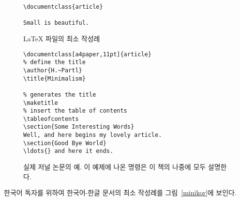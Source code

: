 
\begin{figure}[!p]
\begin{lined}{6cm}
\begin{verbatim}
\documentclass{article}

Small is beautiful.

\end{verbatim}
\end{lined}
\caption{\LaTeX{} 파일의 최소 작성례} \label{mini}
\end{figure}

\begin{figure}[!p]
\begin{lined}{10cm}
\begin{verbatim}
\documentclass[a4paper,11pt]{article}
% define the title
\author{H.~Partl}
\title{Minimalism}

% generates the title
\maketitle
% insert the table of contents
\tableofcontents
\section{Some Interesting Words}
Well, and here begins my lovely article.
\section{Good Bye World}
\ldots{} and here it ends.

\end{verbatim}
\end{lined}
\caption[실제 저널 논문의 예]{실제 저널 논문의 예. 이 예제에 나온 명령은 이 책의 나중에 모두 설명한다.}
\label{document}

\end{figure}

한국어 독자를 위하여 한국어-한글 문서의 최소 작성례를 그림~\ref{minikor}에 보인다.

